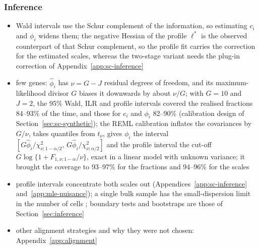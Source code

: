 \documentclass[pdflatex, sn-nature]{sn-jnl}
\theoremstyle{thmstyleone}%
\theoremstyle{thmstyletwo}%
\theoremstyle{thmstylethree}%
\begin{document}
\subsubsection{Inference}
\label{sec:sc-inference}

\begin{itemize}
  \item Wald intervals use the Schur complement of the information, so estimating \(c_{i}\) and \(\phi_{i}\) widens them; the negative
        Hessian of the profile \(\ell^{\ast}\) is the observed counterpart of that Schur complement, so the profile fit carries the
        correction for the estimated scales, whereas the two-stage variant needs the plug-in correction of
        Appendix~\ref{app:sc-inference}
  \item few genes: \(\hat\phi_{i}\) has \(\nu=G-J\) residual degrees of freedom, and its maximum-likelihood divisor \(G\) biases it
        downwards by about \(\nu/G\); with \(G=10\) and \(J=2\), the 95\% Wald, ILR and profile intervals covered the realised
        fractions 84--93\% of the time, and those for \(c_{i}\) and \(\phi_{i}\) 82--90\% (calibration design of
        Section~\ref{sec:sc-synthetic}); the REML calibration inflates the covariances by \(G/\nu\), takes quantiles from
        \(t_{\nu}\), gives \(\phi_{i}\) the interval \([G\hat\phi_{i}/\chi^{2}_{\nu;1-\alpha/2},\,G\hat\phi_{i}/\chi^{2}_{\nu;\alpha/2}]\) and
        the profile interval the cut-off \(G\log\{1+F_{1,\nu;1-\alpha}/\nu\}\), exact in a linear model with unknown variance;
        it brought the coverage to 93--97\% for the fractions and 94--96\% for the scales

  \item profile intervals concentrate both scales out (Appendices~\ref{app:sc-inference} and~\ref{app:mle-nuisance});
        a single bulk sample has the small-dispersion limit in the number of cells
        \cite{jørgensenSmallDispersionAsymptotics1987}; boundary tests and bootstraps are those of
        Section~\ref{sec:inference}
  \item other alignment strategies and why they were not chosen: Appendix~\ref{app:alignment}
\end{itemize}
\end{document}
